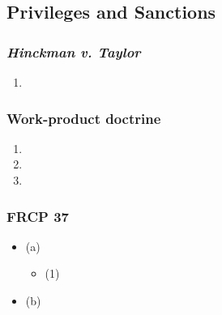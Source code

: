 \subsection{Privileges and Sanctions}

\subsubsection{\emph{Hinckman v. Taylor}}

\begin{enumerate}
    \item %
\end{enumerate}

\subsubsection{Work-product doctrine}

\begin{enumerate}
    \item %
    \item %
    \item %
\end{enumerate}


\subsubsection{FRCP 37}

\begin{itemize}
    \item (a) %
    \begin{itemize}
        \item (1) %
    \end{itemize}
    \item (b) %
\end{itemize}
